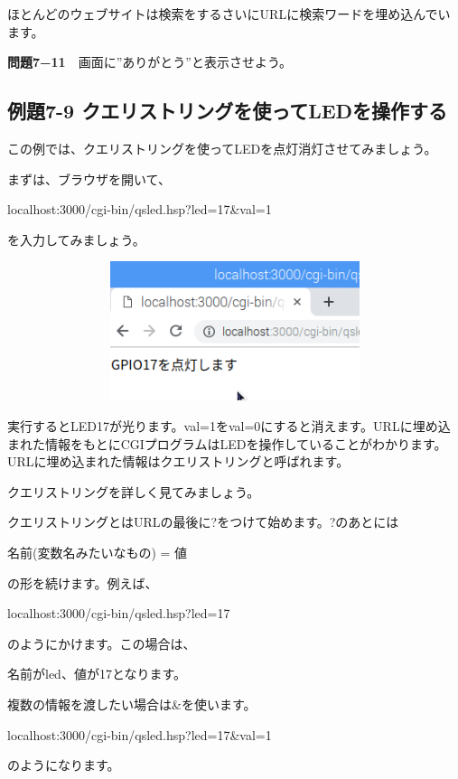\documentclass[a4paper,12pt,dvipdfmx]{jarticle}
\begin{document}
ほとんどのウェブサイトは検索をするさいにURLに検索ワードを埋め込んでいます。


\bigskip

{\bfseries
問題7−11}　画面に”ありがとう”と表示させよう。

\clearpage\subsection*{\rmfamily 例題7-9
クエリストリングを使ってLEDを操作する}
この例では、クエリストリングを使ってLEDを点灯消灯させてみましょう。


\bigskip

まずは、ブラウザを開いて、

localhost:3000/cgi-bin/qsled.hsp?led=17\&val=1

を入力してみましょう。

%


\centering
\includegraphics[width=17.006cm,height=4.078cm]{ome7-img055.png}
\flushleft

実行するとLED17が光ります。val=1をval=0にすると消えます。URLに埋め込まれた情報をもとにCGIプログラムはLEDを操作していることがわかります。URLに埋め込まれた情報はクエリストリングと呼ばれます。


\bigskip

クエリストリングを詳しく見てみましょう。

クエリストリングとはURLの最後に?をつけて始めます。?のあとには

名前(変数名みたいなもの) = 値

の形を続けます。例えば、

localhost:3000/cgi-bin/qsled.hsp?led=17

のようにかけます。この場合は、

名前がled、値が17となります。

複数の情報を渡したい場合は\&を使います。

localhost:3000/cgi-bin/qsled.hsp?led=17\&val=1

のようになります。
\end{document}
